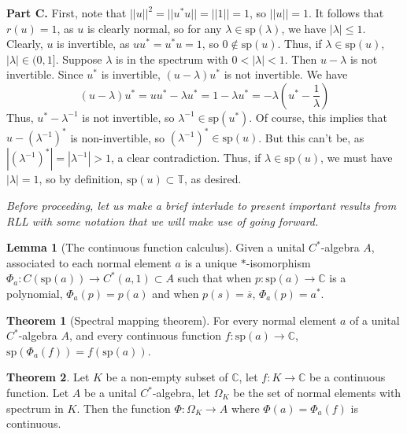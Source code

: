 \documentclass[aps,pra,showpacs,notitlepage,onecolumn,superscriptaddress,nofootinbib]{revtex4-1}
\theoremstyle{definition}
\newtheorem{lemma}{Lemma}[section]
\newtheorem{theorem}{Theorem}[section]
\begin{document}
\noindent \textbf{Part C.} First, note that $||u||^2 = ||u^{*} u|| = ||1|| = 1$, so $||u|| = 1$. It follows that $r(u) = 1$, as $u$ is clearly normal, so for any $\lambda \in \text{sp}(\lambda)$, we have $|\lambda| \leq 1$.
Clearly, $u$ is invertible, as $u u^{*} = u^{*} u = 1$, so $0 \notin \text{sp}(u)$. Thus, if $\lambda \in \text{sp}(u)$, $|\lambda| \in (0, 1]$. Suppose $\lambda$ is in the spectrum with $0 < |\lambda| < 1$. Then $u - \lambda$
  is not invertible. Since $u^{*}$ is invertible, $(u - \lambda) u^{*}$ is not invertible. We have
  \begin{equation}
    (u - \lambda) u^{*} = u u^{*} - \lambda u^{*} = 1 - \lambda u^{*} = -\lambda \left(u^{*} - \frac{1}{\lambda}\right)
  \end{equation}
  Thus, $u^{*} - \lambda^{-1}$ is not invertible, so $\lambda^{-1} \in \text{sp}(u^{*})$. Of course, this implies that $u - (\lambda^{-1})^{*}$ is non-invertible, so $(\lambda^{-1})^{*} \in \text{sp}(u)$. But this can't be, as $|(\lambda^{-1})^{*}| = |\lambda^{-1}| > 1$,
  a clear contradiction. Thus, if $\lambda \in \text{sp}(u)$, we must have $|\lambda| = 1$, so by definition, $\text{sp}(u) \subset \mathbb{T}$, as desired.
  \newline

  \noindent \emph{Before proceeding, let us make a brief interlude to present important results from RLL with some notation that we will make use of going forward.}

  \begin{lemma}[The continuous function calculus]
    Given a unital $C^{*}$-algebra $A$, associated to each normal element $a$ is a unique $*$-isomorphism $\Phi_a : C(\text{sp}(a)) \rightarrow C^{*}(a, 1) \subset A$ such
    that when $p : \text{sp}(a) \rightarrow \mathbb{C}$ is a polynomial, $\Phi_a(p) = p(a)$ and when $p(s) = \overline{s}$, $\Phi_a(p) = a^{*}$.
    \label{lem:cont}
  \end{lemma}

  \begin{theorem}[Spectral mapping theorem]
    \label{thm:spectral}
    For every normal element $a$ of a unital $C^{*}$-algebra $A$, and every continuous function $f : \text{sp}(a) \rightarrow \mathbb{C}$, $\text{sp}(\Phi_a(f)) = f(\text{sp}(a))$.
  \end{theorem}

  \begin{theorem}
    Let $K$ be a non-empty subset of $\mathbb{C}$, let $f : K \rightarrow \mathbb{C}$ be a continuous function. Let $A$ be a unital $C^{*}$-algebra, let $\Omega_K$ be the set of normal elements with spectrum in $K$.
    Then the function $\Phi : \Omega_K \rightarrow A$ where $\Phi(a) = \Phi_a(f)$ is continuous.
  \end{theorem}
\end{document}

